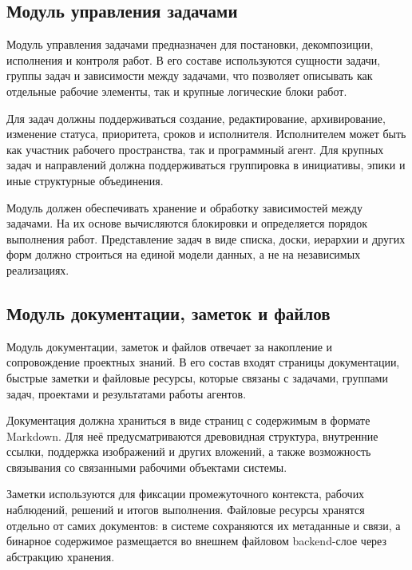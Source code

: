 \textheadingsep
\subsection{Модуль управления задачами}

\headingtextsep

Модуль управления задачами предназначен для постановки, декомпозиции, исполнения и контроля работ. В его составе используются сущности задачи, группы задач и зависимости между задачами, что позволяет описывать как отдельные рабочие элементы, так и крупные логические блоки работ.

Для задач должны поддерживаться создание, редактирование, архивирование, изменение статуса, приоритета, сроков и исполнителя. Исполнителем может быть как участник рабочего пространства, так и программный агент. Для крупных задач и направлений должна поддерживаться группировка в инициативы, эпики и иные структурные объединения.

Модуль должен обеспечивать хранение и обработку зависимостей между задачами. На их основе вычисляются блокировки и определяется порядок выполнения работ. Представление задач в виде списка, доски, иерархии и других форм должно строиться на единой модели данных, а не на независимых реализациях.

\textheadingsep
\subsection{Модуль документации, заметок и файлов}

\headingtextsep

Модуль документации, заметок и файлов отвечает за накопление и сопровождение проектных знаний. В его состав входят страницы документации, быстрые заметки и файловые ресурсы, которые связаны с задачами, группами задач, проектами и результатами работы агентов.

Документация должна храниться в виде страниц с содержимым в формате Markdown. Для неё предусматриваются древовидная структура, внутренние ссылки, поддержка изображений и других вложений, а также возможность связывания со связанными рабочими объектами системы.

Заметки используются для фиксации промежуточного контекста, рабочих наблюдений, решений и итогов выполнения. Файловые ресурсы хранятся отдельно от самих документов: в системе сохраняются их метаданные и связи, а бинарное содержимое размещается во внешнем файловом backend-слое через абстракцию хранения.

